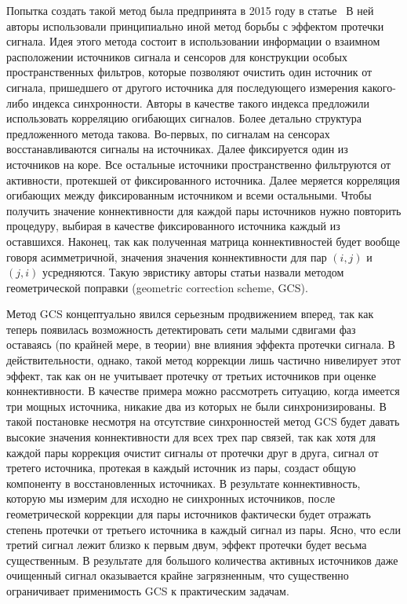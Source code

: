 Попытка создать такой метод была предпринята в 2015 году в
статье~\cite{Wens2015} В ней авторы использовали принципиально иной метод
борьбы с эффектом протечки сигнала.  Идея этого метода состоит в использовании
информации о взаимном расположении источников сигнала и сенсоров для
конструкции особых пространственных фильтров, которые позволяют очистить один
источник от сигнала, пришедшего от другого источника для последующего измерения
какого-либо индекса синхронности. Авторы в качестве такого индекса предложили
использовать корреляцию огибающих сигналов. Более детально структура
предложенного метода такова. Во-первых, по сигналам на сенсорах
восстанавливаются сигналы на источниках.  Далее фиксируется один из источников
на коре.  Все остальные источники пространственно фильтруются от активности,
протекшей от фиксированного источника.  Далее меряется корреляция огибающих
между фиксированным источником и всеми остальными.  Чтобы получить значение
коннективности для каждой пары источников нужно повторить процедуру, выбирая в
качестве фиксированного источника каждый из оставшихся.  Наконец, так как
полученная матрица коннективностей будет вообще говоря асимметричной, значения
значения коннективности для пар $(i,j)$ и $(j,i)$ усредняются. Такую эвристику
авторы статьи назвали методом геометрической поправки (geometric correction
scheme, GCS).

Метод GCS концептуально явился серьезным продвижением вперед, так как теперь
появилась возможность детектировать сети малыми сдвигами фаз оставаясь (по
крайней мере, в теории) вне влияния эффекта протечки сигнала.  В
действительности, однако, такой метод коррекции лишь частично нивелирует этот
эффект, так как он не учитывает протечку от третьих источников при оценке
коннективности. В качестве примера можно рассмотреть ситуацию, когда имеется
три мощных источника, никакие два из которых не были синхронизированы.  В такой
постановке несмотря на отсутствие синхронностей метод GCS будет давать высокие
значения коннективности для всех трех пар связей, так как хотя для каждой пары
коррекция очистит сигналы от протечки друг в друга, сигнал от третего
источника, протекая в каждый источник из пары, создаст общую компоненту в
восстановленных источниках.  В результате коннективность, которую мы измерим
для исходно не синхронных источников, после геометрической коррекции для пары
источников фактически будет отражать степень протечки от третьего источника в
каждый сигнал из пары. Ясно, что если третий сигнал лежит близко к первым двум,
эффект протечки будет весьма существенным. В результате для большого количества
активных источников даже очищенный сигнал оказывается крайне загрязненным, что
существенно ограничивает применимость GCS к практическим задачам.



